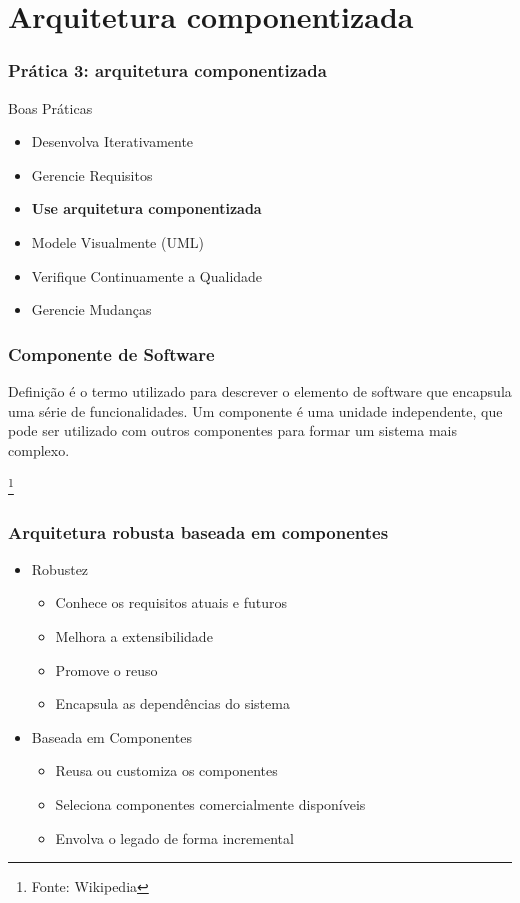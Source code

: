 \section{Arquitetura componentizada}
\begin{frame}
 \frametitle{Prática 3: arquitetura componentizada}
 \begin{block}{Boas Práticas}
 \begin{itemize}
  \item Desenvolva Iterativamente
  \item Gerencie Requisitos
  \item \textbf{Use arquitetura componentizada}
  \item  Modele Visualmente (UML)
  \item  Verifique Continuamente a Qualidade
  \item Gerencie Mudanças  
 \end{itemize}
\end{block}
\end{frame}

\begin{frame}
 \frametitle{Componente de Software}
 \begin{block}{Definição}
  é o termo utilizado para descrever o elemento de software que encapsula uma série de funcionalidades. 
  Um componente é uma unidade independente, que pode ser utilizado com outros componentes para formar um sistema mais complexo.
 \end{block}
\footnote{Fonte: Wikipedia}
\end{frame}

\begin{frame}
 \frametitle{Arquitetura robusta baseada em componentes}
 \begin{itemize}
  \item Robustez
  \begin{itemize}
   \item Conhece os requisitos atuais e futuros
    \item Melhora a extensibilidade
    \item Promove o reuso
    \item Encapsula as dependências do sistema
  \end{itemize}
  \item Baseada em Componentes
  \begin{itemize}
   \item Reusa ou customiza os componentes
    \item Seleciona componentes comercialmente disponíveis
    \item Envolva o legado de forma incremental
  \end{itemize}
 \end{itemize}
\end{frame}

